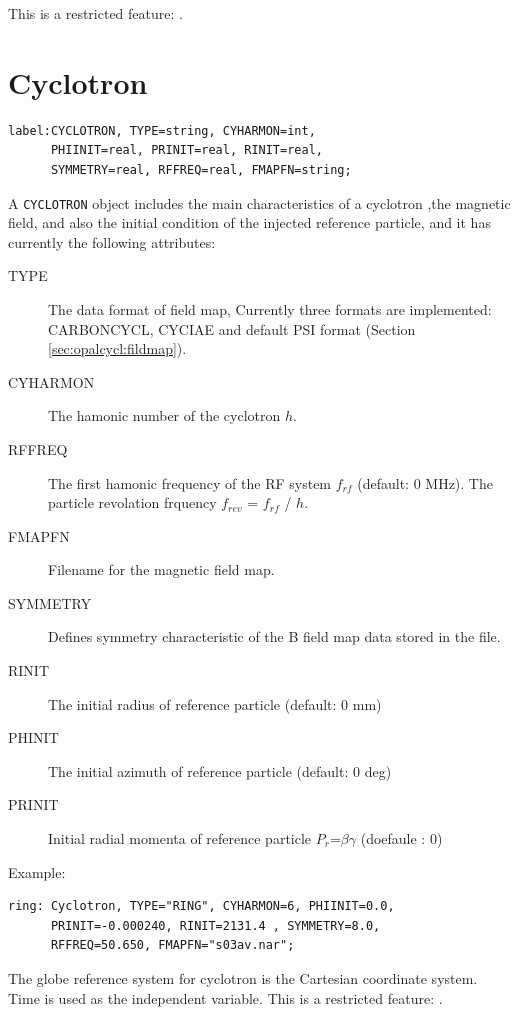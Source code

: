 This is a restricted feature: \noopalcycl .

\section{Cyclotron}
\label{sec:cyclotron}
\begin{verbatim}
label:CYCLOTRON, TYPE=string, CYHARMON=int, 
      PHIINIT=real, PRINIT=real, RINIT=real, 
      SYMMETRY=real, RFFREQ=real, FMAPFN=string;
\end{verbatim}
A \texttt{CYCLOTRON} object includes the main characteristics of a cyclotron ,the magnetic field, 
 and also the initial condition of the injected reference particle, and it has currently the following attributes:
\begin{description}
\item[TYPE]
   The data format of field map, Currently three formats are implemented:
   CARBONCYCL, CYCIAE and default PSI format (Section \ref{sec:opalcycl:fildmap}).
\item[CYHARMON]
  The hamonic number of the cyclotron $h$. 
\item[RFFREQ]
  The first hamonic frequency of the RF system $f_{rf}$  (default: 0 MHz).
  The particle revolation frquency $f_{rev}$ =  $f_{rf}$ / $h$.
\item[FMAPFN]
  Filename for the magnetic field map. 
\item[SYMMETRY]
  Defines symmetry characteristic of the B field map data stored in the file.  
\item[RINIT]
  The initial radius of reference particle (default: 0 mm)
\item[PHINIT]
  The initial azimuth of reference particle (default: 0 deg)
\item[PRINIT]
  Initial radial momenta of reference particle $P_r$=$\beta$$\gamma$ (doefaule : 0)
\end{description}
\noindent Example:
\begin{verbatim}
ring: Cyclotron, TYPE="RING", CYHARMON=6, PHIINIT=0.0, 
      PRINIT=-0.000240, RINIT=2131.4 , SYMMETRY=8.0, 
      RFFREQ=50.650, FMAPFN="s03av.nar";
\end{verbatim}
The globe reference system for cyclotron is the Cartesian coordinate system.
Time is used as the  independent variable.
This is a restricted feature: \opalcycl .
